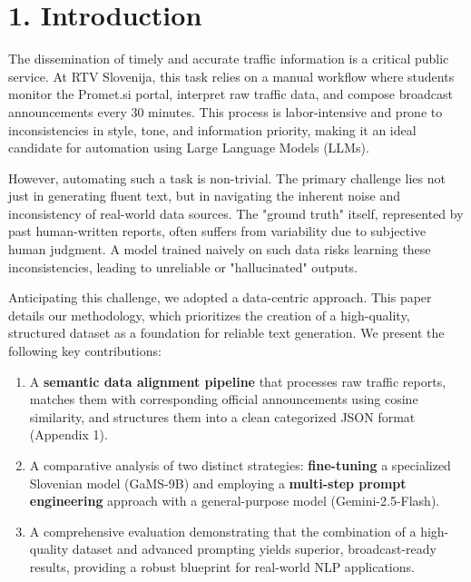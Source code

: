 \documentclass[fleqn,moreauthors,10pt]{ds_report}
\affiliation{\textit{Advisors: Slavko Žitnik}}
\begin{document}
\flushbottom 

\maketitle 

\thispagestyle{empty} 


\section*{1. Introduction}
The dissemination of timely and accurate traffic information is a critical public service. At RTV Slovenija, this task relies on a manual workflow where students monitor the Promet.si portal, interpret raw traffic data, and compose broadcast announcements every 30 minutes. This process is labor-intensive and prone to inconsistencies in style, tone, and information priority, making it an ideal candidate for automation using Large Language Models (LLMs).

However, automating such a task is non-trivial. The primary challenge lies not just in generating fluent text, but in navigating the inherent noise and inconsistency of real-world data sources. The "ground truth" itself, represented by past human-written reports, often suffers from variability due to subjective human judgment. A model trained naively on such data risks learning these inconsistencies, leading to unreliable or "hallucinated" outputs.

Anticipating this challenge, we adopted a data-centric approach. This paper details our methodology, which prioritizes the creation of a high-quality, structured dataset as a foundation for reliable text generation. We present the following key contributions:
\begin{enumerate}
    \item A \textbf{semantic data alignment pipeline} that processes raw traffic reports, matches them with corresponding official announcements using cosine similarity, and structures them into a clean categorized JSON format (Appendix 1).
    \item A comparative analysis of two distinct strategies: \textbf{fine-tuning} a specialized Slovenian model (GaMS-9B) and employing a \textbf{multi-step prompt engineering} approach with a general-purpose model (Gemini-2.5-Flash).
    \item A comprehensive evaluation demonstrating that the combination of a high-quality dataset and advanced prompting yields superior, broadcast-ready results, providing a robust blueprint for real-world NLP applications.
\end{enumerate}
\end{document}

